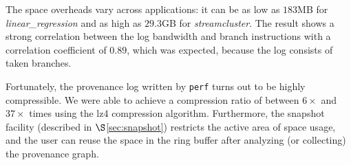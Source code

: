 The space overheads vary across applications: it can be as low as $183$MB for {\em linear\_regression} and as high as $29.3$GB for {\em streamcluster}. The result shows a strong correlation between the log bandwidth and branch instructions with a correlation coefficient of 0.89, which was expected, because the
log consists of taken branches.

Fortunately,  the provenance log written by {\tt perf} turns out to be highly compressible. We
were able to achieve a compression ratio of between $6\times$ and $37\times$ times using the lz4 compression algorithm. 
Furthermore, the snapshot facility (described in $\S$\ref{sec:snapshot}) restricts the active area of space usage, and the user can reuse the space in the ring buffer after analyzing (or collecting) the provenance graph.







